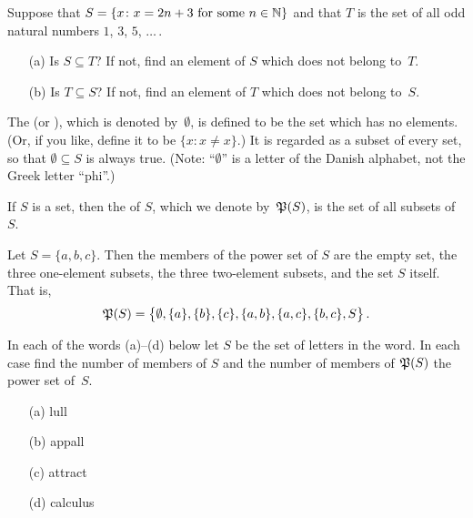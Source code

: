\begin{prob} Suppose that $S = \{x\colon x = 2n + 3 \text{ for some $n \in \mathbb{N}$}\}$ and that
$T$ is the set of all odd natural numbers $1$, $3$, $5$, $\dots$\,.
 \begin{enumerate}
  \item[(a)] Is $S \subseteq T$?  If not, find an element of $S$ which does not
belong to~$T$.
  \item[(b)] Is $T \subseteq S$?  If not, find an element of $T$ which does not
belong to~$S$.
 \end{enumerate}
\end{prob}


\begin{defn}  The
 (or
), which is denoted
by~$\emptyset$, is defined to be the set which has no elements. (Or, if you like, define it to
be $\{x\colon x \ne x\}$.) It is regarded as a subset of every set, so that
$\emptyset\subseteq S$ is always true.  (Note: ``$\emptyset$'' is a letter of the Danish
alphabet, not the Greek letter ``phi''.)
\end{defn}

\begin{defn} If $S$ is a set, then the  of $S$, which we denote
by~$\mathfrak{P}(S)$, is the set of all subsets of $S$.
\end{defn}

\begin{exam} Let $S = \{a,b,c\}$.  Then the members of the power set of $S$ are the empty set,
the three one-element subsets, the three two-element subsets, and the set $S$ itself.  That
is,
  \[ \mathfrak{P}(S) = \bigl\{\emptyset,\{a\},\{b\}, \{c\}, \{a,b\},
            \{a,c\}, \{b,c\},S\bigr\}\,. \]
\end{exam}

\begin{prob} In each of the words (a)--(d) below let $S$ be the set of letters in the word.
In each case find the number of members of $S$ and the number of members of $\mathfrak{P}(S)$
the power set of~$S$.
 \begin{enumerate}
  \item[(a)] lull
  \item[(b)] appall
  \item[(c)] attract
  \item[(d)] calculus
 \end{enumerate}
\end{prob}


